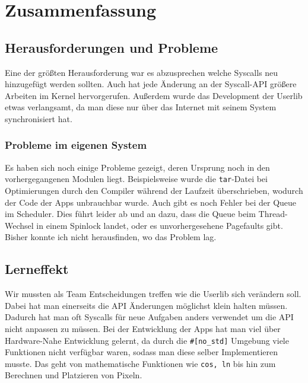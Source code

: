 \section{Zusammenfassung}

\subsection{Herausforderungen und Probleme}
    Eine der größten Herausforderung war es abzusprechen welche Syscalls neu hinzugefügt werden sollten. Auch hat jede Änderung an der Syscall-API größere Arbeiten im Kernel hervorgerufen. Außerdem wurde das Development der Userlib etwas verlangsamt, da man diese nur über das Internet mit seinem System synchronisiert hat. \newline
    \subsubsection{Probleme im eigenen System}
        Es haben sich noch einige Probleme gezeigt, deren Ursprung noch in den vorhergegangenen Modulen liegt. Beispielsweise wurde die \verb|tar|-Datei bei Optimierungen durch den Compiler während der Laufzeit überschrieben, wodurch der Code der Apps unbrauchbar wurde. Auch gibt es noch Fehler bei der Queue im Scheduler. Dies führt leider ab und an dazu, dass die Queue beim Thread-Wechsel in einem Spinlock landet, oder es unvorhergesehene Pagefaults gibt. Bisher konnte ich nicht herausfinden, wo das Problem lag.

\subsection{Lerneffekt}
    Wir mussten als Team Entscheidungen treffen wie die Userlib sich verändern soll. Dabei hat man einerseits die API Änderungen möglichst klein halten müssen. Dadurch hat man oft Syscalls für neue Aufgaben anders verwendet um die API nicht anpassen zu müssen. \newline
    Bei der Entwicklung der Apps hat man viel über Hardware-Nahe Entwicklung gelernt, da durch die \verb|#[no_std]| Umgebung viele Funktionen nicht verfügbar waren, sodass man diese selber Implementieren musste. Das geht von mathematische Funktionen wie \verb|cos, ln| bis hin zum Berechnen und Platzieren von Pixeln.
